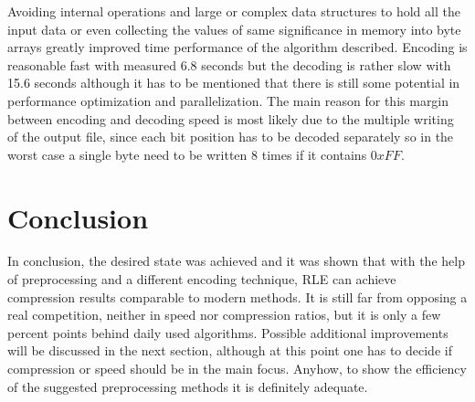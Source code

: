 \par{
	Avoiding internal operations and large or complex data structures to hold all the input data or even collecting the values of same significance in memory into byte arrays greatly improved time performance of the algorithm described. Encoding is reasonable fast with measured 6.8 seconds but the decoding is rather slow with 15.6 seconds although it has to be mentioned that there is still some potential in performance optimization and parallelization. The main reason for this margin between encoding and decoding speed is most likely due to the multiple writing of the output file, since each bit position has to be decoded separately so in the worst case a single byte need to be written 8 times if it contains $0xFF$. 
}

\section{Conclusion}
\label{ch:Evaluation:sec:Conclusion}
\par{
In conclusion, the desired state was achieved and it was shown that with the help of preprocessing and a different encoding technique, RLE can achieve compression results comparable to modern methods. It is still far from opposing a real competition, neither in speed nor compression ratios, but it is only a few percent points behind daily used algorithms. Possible additional improvements will be discussed in the next section, although at this point one has to decide if compression or speed should be in the main focus. Anyhow, to show the efficiency of the suggested preprocessing methods it is definitely adequate.
}
